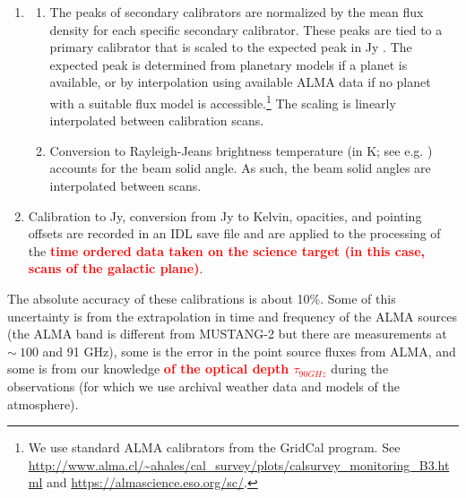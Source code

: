 \documentclass[twocolumn]{aastex62}
\def\change#1{{\textcolor{red}{\textbf{#1}}}}
\newcommand{\MUSTANG}{MUSTANG-2\xspace}
\begin{document}
\begin{enumerate}
\begin{enumerate}
        \end{enumerate}
    \item
        \begin{enumerate}
            \item The peaks of secondary calibrators are normalized by the mean
                flux density for each specific secondary calibrator. These
                peaks are tied to a primary calibrator that is scaled to the
                expected peak in Jy \perbeam.  The expected peak is determined
                from planetary models if a planet is available, or by
                interpolation using available ALMA data
                \citep{vanKempen2014a,Fomalont2014a} if no planet with a
                suitable flux model is accessible.\footnote{We use
                standard ALMA calibrators from the GridCal program.  See
                \url{http://www.alma.cl/~ahales/cal_survey/plots/calsurvey_monitoring_B3.html} and 
                \url{https://almascience.eso.org/sc/}.}
                The scaling is
                linearly interpolated between calibration scans.
            \item Conversion to Rayleigh-Jeans brightness temperature (in K;
                see e.g. \citealt{Condon2016a}) accounts for the beam solid
                angle. As such, the beam solid angles are interpolated between
                scans.
        \end{enumerate}
    \item Calibration to Jy, conversion from Jy \perbeam to Kelvin, opacities,
        and pointing offsets are recorded in an IDL save file and are
        applied to the processing of the \change{time ordered data taken on the
        science target (in this case, scans of the galactic plane)}.
\end{enumerate}

The absolute accuracy of these calibrations is about 10\%.  Some of this
uncertainty is from the extrapolation in time and frequency of the ALMA sources
(the ALMA band is different from \MUSTANG but there are measurements at
$\sim~100$ and 91 GHz), some is the error in the point source fluxes from ALMA,
and some is from our knowledge \change {of the optical depth $\tau_{90 GHz}$}
during the observations (for which we use archival weather data and models of
the atmosphere).
\end{document}
